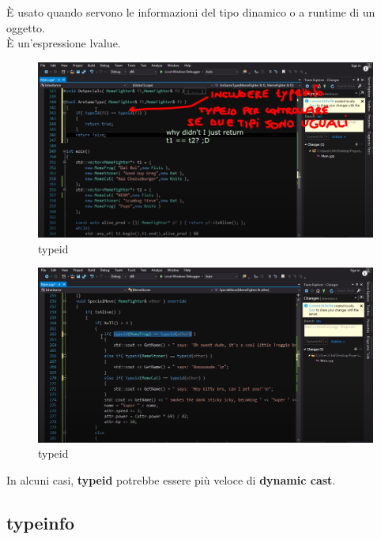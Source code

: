 \textsf{\small È usato quando servono le informazioni del tipo dinamico o a runtime di un oggetto.} \\
\textsf{\small È un'espressione lvalue.} \\

\begin{figure}[H]
	\centering
	\includegraphics[width=1\textwidth, height=1\textheight, keepaspectratio]{./imgs/typeinfo_typeid.png}
	\caption{typeid}
	\label{fig:typeinfo_typeid}
\end{figure}

\begin{figure}[H]
	\centering
	\includegraphics[width=1\textwidth, height=1\textheight, keepaspectratio]{./imgs/typeinfo_typeid_if.png}
	\caption{typeid}
	\label{fig:typeinfo_typeid_if}
\end{figure}

\textsf{\small In alcuni casi, \textbf{typeid} potrebbe essere più veloce di \textbf{dynamic cast}.} \\

\subsection{typeinfo}


